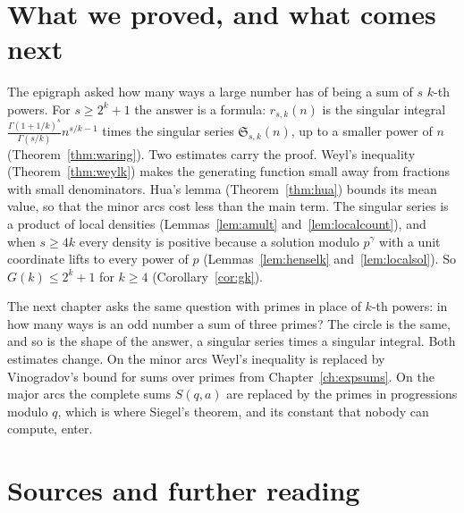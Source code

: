 \section{What we proved, and what comes next}

The epigraph asked how many ways a large number has of being a sum of $s$ $k$-th powers. For $s\ge2^k+1$ the answer is a formula: $r_{s,k}(n)$ is the singular integral $\frac{\Gamma(1+1/k)^s}{\Gamma(s/k)}n^{s/k-1}$ times the singular series $\mathfrak S_{s,k}(n)$, up to a smaller power of $n$ (Theorem~\ref{thm:waring}). Two estimates carry the proof. Weyl's inequality (Theorem~\ref{thm:weylk}) makes the generating function small away from fractions with small denominators. Hua's lemma (Theorem~\ref{thm:hua}) bounds its mean value, so that the minor arcs cost less than the main term. The singular series is a product of local densities (Lemmas~\ref{lem:amult} and~\ref{lem:localcount}), and when $s\ge4k$ every density is positive because a solution modulo $p^\gamma$ with a unit coordinate lifts to every power of $p$ (Lemmas~\ref{lem:henselk} and~\ref{lem:localsol}). So $G(k)\le2^k+1$ for $k\ge4$ (Corollary~\ref{cor:gk}).

The next chapter asks the same question with primes in place of $k$-th powers: in how many ways is an odd number a sum of three primes? The circle is the same, and so is the shape of the answer, a singular series times a singular integral. Both estimates change. On the minor arcs Weyl's inequality is replaced by Vinogradov's bound for sums over primes from Chapter~\ref{ch:expsums}. On the major arcs the complete sums $S(q,a)$ are replaced by the primes in progressions modulo $q$, which is where Siegel's theorem, and its constant that nobody can compute, enter.

\section*{Sources and further reading}

